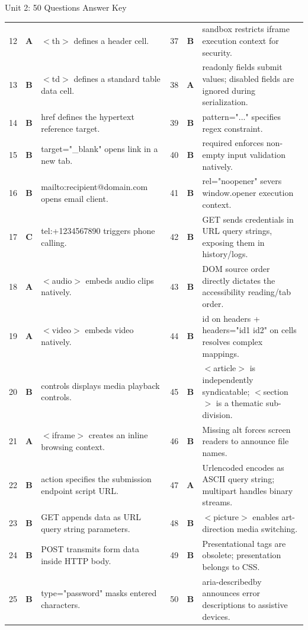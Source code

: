 \begin{answerkeytable}{Unit 2: 50 Questions Answer Key}
\begin{tabularx}{\textwidth}{l c X l c X}
12 & \textbf{A} & $<$th$>$ defines a header cell. & 37 & \textbf{B} & sandbox restricts iframe execution context for security. \\
13 & \textbf{B} & $<$td$>$ defines a standard table data cell. & 38 & \textbf{A} & readonly fields submit values; disabled fields are ignored during serialization. \\
14 & \textbf{B} & href defines the hypertext reference target. & 39 & \textbf{B} & pattern="..." specifies regex constraint. \\
15 & \textbf{B} & target="\_blank" opens link in a new tab. & 40 & \textbf{B} & required enforces non-empty input validation natively. \\
16 & \textbf{B} & mailto:recipient@domain.com opens email client. & 41 & \textbf{B} & rel="noopener" severs window.opener execution context. \\
17 & \textbf{C} & tel:+1234567890 triggers phone calling. & 42 & \textbf{B} & GET sends credentials in URL query strings, exposing them in history/logs. \\
18 & \textbf{A} & $<$audio$>$ embeds audio clips natively. & 43 & \textbf{B} & DOM source order directly dictates the accessibility reading/tab order. \\
19 & \textbf{A} & $<$video$>$ embeds video natively. & 44 & \textbf{B} & id on headers + headers="id1 id2" on cells resolves complex mappings. \\
20 & \textbf{B} & controls displays media playback controls. & 45 & \textbf{B} & $<$article$>$ is independently syndicatable; $<$section$>$ is a thematic sub-division. \\
21 & \textbf{A} & $<$iframe$>$ creates an inline browsing context. & 46 & \textbf{B} & Missing alt forces screen readers to announce file names. \\
22 & \textbf{B} & action specifies the submission endpoint script URL. & 47 & \textbf{A} & Urlencoded encodes as ASCII query string; multipart handles binary streams. \\
23 & \textbf{B} & GET appends data as URL query string parameters. & 48 & \textbf{B} & $<$picture$>$ enables art-direction media switching. \\
24 & \textbf{B} & POST transmits form data inside HTTP body. & 49 & \textbf{B} & Presentational tags are obsolete; presentation belongs to CSS. \\
25 & \textbf{B} & type="password" masks entered characters. & 50 & \textbf{B} & aria-describedby announces error descriptions to assistive devices. \\
\bottomrule
\end{tabularx}
\end{answerkeytable}

